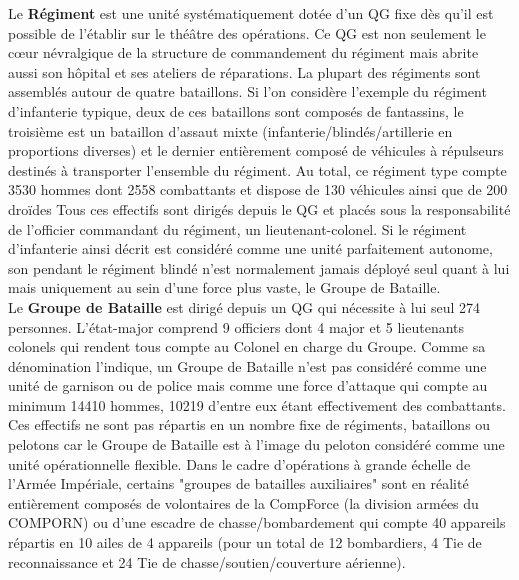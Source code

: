 \documentclass[twoside]{article}
\begin{document}
Le \textbf{Régiment} est une unité systématiquement dotée d'un QG fixe dès qu'il est possible de l'établir sur le théâtre des opérations. Ce QG est non seulement le c\oe ur névralgique de la structure de commandement du régiment mais abrite aussi son hôpital et ses ateliers de réparations. La plupart des régiments sont assemblés autour de quatre bataillons. Si l'on considère l'exemple du régiment d'infanterie typique, deux de ces bataillons sont composés de fantassins, le troisième est un bataillon d'assaut mixte (infanterie/blindés/artillerie en proportions diverses) et le dernier entièrement composé de véhicules à répulseurs destinés à transporter l'ensemble du régiment. Au total, ce régiment type compte 3530 hommes dont 2558 combattants et dispose de 130 véhicules ainsi que de 200 droïdes Tous ces effectifs sont dirigés depuis le QG et placés sous la responsabilité de l'officier commandant du régiment, un lieutenant-colonel. Si le régiment d'infanterie ainsi décrit est considéré comme une unité parfaitement autonome, son pendant le régiment blindé n'est normalement jamais déployé seul quant à lui mais uniquement au sein d'une force plus vaste, le Groupe de Bataille.\\

Le \textbf{Groupe de Bataille} est dirigé depuis un QG qui nécessite à lui seul 274 personnes. L'état-major comprend 9 officiers dont 4 major et 5 lieutenants colonels qui rendent tous compte au Colonel en charge du Groupe. Comme sa dénomination l'indique, un Groupe de Bataille n'est pas considéré comme une unité de garnison ou de police mais comme une force d'attaque qui compte au minimum 14410 hommes, 10219 d'entre eux étant effectivement des combattants. Ces effectifs ne sont pas répartis en un nombre fixe de régiments, bataillons ou pelotons car le Groupe de Bataille est à l'image du peloton considéré comme une unité opérationnelle flexible. Dans le cadre d'opérations à grande échelle de l'Armée Impériale, certains "groupes de batailles auxiliaires" sont en réalité entièrement composés de volontaires de la CompForce (la division armées du COMPORN) ou d'une escadre de chasse/bombardement qui compte 40 appareils répartis en 10 ailes de 4 appareils (pour un total de 12 bombardiers, 4 Tie de reconnaissance et 24 Tie de chasse/soutien/couverture aérienne).\\
\end{document}
